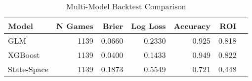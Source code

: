 \begin{table}[htbp]
\centering
\caption{Multi-Model Backtest Comparison}
\label{tab:multimodel}
\begin{tabular}{lrrrrrr}
\toprule
 \textbf{Model} & \textbf{N Games} & \textbf{Brier} & \textbf{Log Loss} & \textbf{Accuracy} & \textbf{ROI} \\
\midrule
GLM & 1139 & 0.0660 & 0.2330 & 0.925 & 0.818 \\
XGBoost & 1139 & 0.0400 & 0.1433 & 0.949 & 0.822 \\
State-Space & 1139 & 0.1873 & 0.5549 & 0.721 & 0.448 \\
\bottomrule
\end{tabular}
\end{table}
